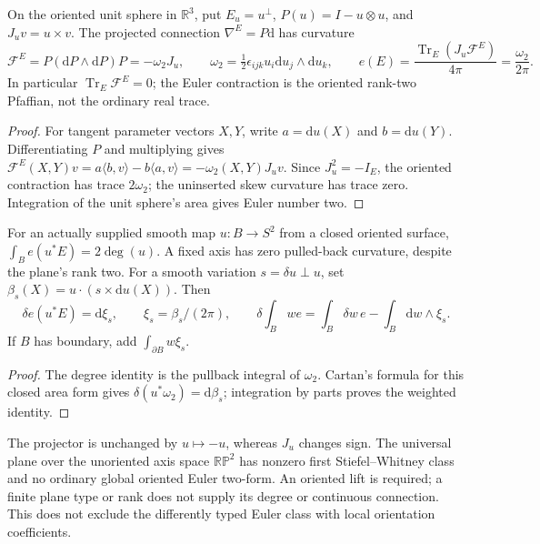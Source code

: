 \documentclass[11pt]{article}
\begin{document}
\begin{theorem}
\label{p1:thm:v2203-projector-euler}
On the oriented unit sphere in \(\mathbb R^3\), put
\(E_u=u^\perp\), \(P(u)=I-u\otimes u\), and \(J_uv=u\times v\).
The projected connection \(\nabla^E=P\mathrm d\) has curvature
\begin{equation}
\label{p1:eq:v2203-projector-pfaffian}
 \mathcal F^E=P(\mathrm dP\wedge\mathrm dP)P=-\omega_2J_u,
 \qquad \omega_2=\tfrac12\epsilon_{ijk}u_i\mathrm du_j\wedge\mathrm du_k,
 \qquad e(E)=\frac{\operatorname{Tr}_{E}(J_u\mathcal F^E)}{4\pi}
             =\frac{\omega_2}{2\pi}.
\end{equation}
In particular \(\operatorname{Tr}_{E}\mathcal F^E=0\); the Euler
contraction is the oriented rank-two Pfaffian, not the ordinary real trace.
\end{theorem}
\begin{proof}
For tangent parameter vectors \(X,Y\), write \(a=\mathrm du(X)\) and
\(b=\mathrm du(Y)\). Differentiating \(P\) and multiplying gives
\(\mathcal F^E(X,Y)v=a\langle b,v\rangle-b\langle a,v\rangle
=-\omega_2(X,Y)J_uv\). Since \(J_u^2=-I_E\), the oriented contraction
has trace \(2\omega_2\); the uninserted skew curvature has trace zero.
Integration of the unit sphere's area gives Euler number two.
\end{proof}

\begin{corollary}
\label{p1:cor:v2203-euler-degree-transgression}
For an actually supplied smooth map \(u:B\to S^2\) from a closed oriented
surface, \(\int_B e(u^*E)=2\deg(u)\). A fixed axis has zero pulled-back
curvature, despite the plane's rank two. For a smooth variation
\(s=\delta u\perp u\), set
\(\beta_s(X)=u\cdot(s\times\mathrm du(X))\). Then
\[
 \delta e(u^*E)=\mathrm d\xi_s,\qquad \xi_s=\beta_s/(2\pi),
 \qquad
 \delta\int_Bw e=\int_B\delta w\,e-\int_B\mathrm dw\wedge\xi_s.
\]
If \(B\) has boundary, add \(\int_{\partial B}w\xi_s\).
\end{corollary}
\begin{proof}
The degree identity is the pullback integral of \(\omega_2\).
Cartan's formula for this closed area form gives
\(\delta(u^*\omega_2)=\mathrm d\beta_s\); integration by parts proves
the weighted identity.
\end{proof}
The projector is unchanged by \(u\mapsto-u\), whereas \(J_u\) changes
sign. The universal plane over the unoriented axis space \(\mathbb{RP}^2\)
has nonzero first Stiefel--Whitney class and no ordinary global oriented
Euler two-form. An oriented lift is required; a finite plane type or rank
does not supply its degree or continuous connection. This does not exclude
the differently typed Euler class with local orientation coefficients.
\end{document}
